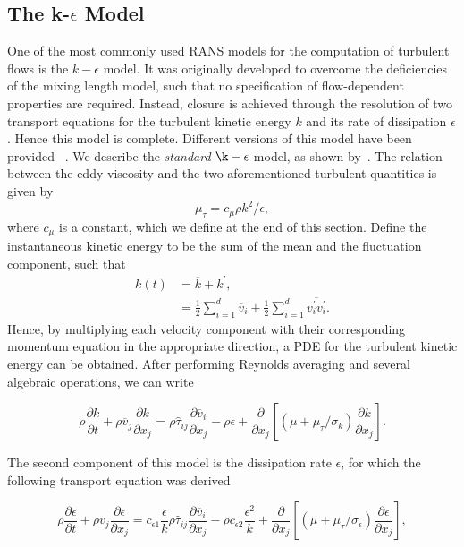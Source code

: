 \subsection{The k-$\epsilon$ Model}
One of the most commonly used RANS models for the computation of turbulent flows is the $k-\epsilon$ model. It was originally developed to overcome the deficiencies of the mixing length model, such that no specification of flow-dependent properties are required. Instead, closure is achieved through the resolution of two transport equations for the turbulent kinetic energy $k$ and its rate of dissipation $\epsilon$. Hence this model is complete. Different versions of this model have been provided ~\cite{laundersharma, launderjones}. We describe the \textit{standard} $\k-\epsilon$ model, as shown by~\cite{bardina}. The relation between the eddy-viscosity and the two aforementioned turbulent quantities is given by
\begin{equation}
    \mu_\tau = c_\mu \rho k^2/\epsilon,
\end{equation}
where $c_\mu$ is a constant, which we define at the end of this section. Define the instantaneous kinetic energy to be the sum of the mean and the fluctuation component, such that
\begin{align}
    k(t) &= \overline{k} + k^\prime, \nonumber \\
         &= \frac{1}{2} \sum_{i=1}^d \overline{v}_i + \frac{1}{2}\sum_{i=1}^d \overline{v_i^\prime v_i^\prime}.
\end{align}
Hence, by multiplying each velocity component with their corresponding momentum equation in the appropriate direction, a PDE for the turbulent kinetic energy can be obtained. After performing Reynolds averaging and several algebraic operations, we can write
\begin{eqBox}
\begin{equation}
    \rho\frac{\partial k}{\partial t} + 
    \rho\overline v_j \frac{\partial k}{\partial x_j} 
    = \rho \hat \tau_{ij} \frac{\partial \overline v_i}{\partial x_j}
    - \rho\epsilon + \frac{\partial}{\partial x_j}\left[(\mu + \mu_\tau/\sigma_k)\frac{\partial k}{\partial x_j}\right].
\end{equation}
\end{eqBox}
The second component of this model is the dissipation rate $\epsilon$, for which the following transport equation was derived
\begin{eqBox}
\begin{equation}
    \rho \frac{\partial \epsilon}{\partial t}
    + \rho\overline v_j \frac{\partial\epsilon}{\partial x_j}
    = c_{\epsilon 1}\frac{\epsilon}{k}  \rho \hat \tau_{ij} \frac{\partial \overline v_i}{\partial x_j}
    - \rho c_{\epsilon2} \frac{\epsilon^2}{k} 
    + \frac{\partial}{\partial x_j} \left[(\mu + \mu_\tau/\sigma_\epsilon) \frac{\partial\epsilon}{\partial x_j}\right],
\end{equation}
\end{eqBox}
